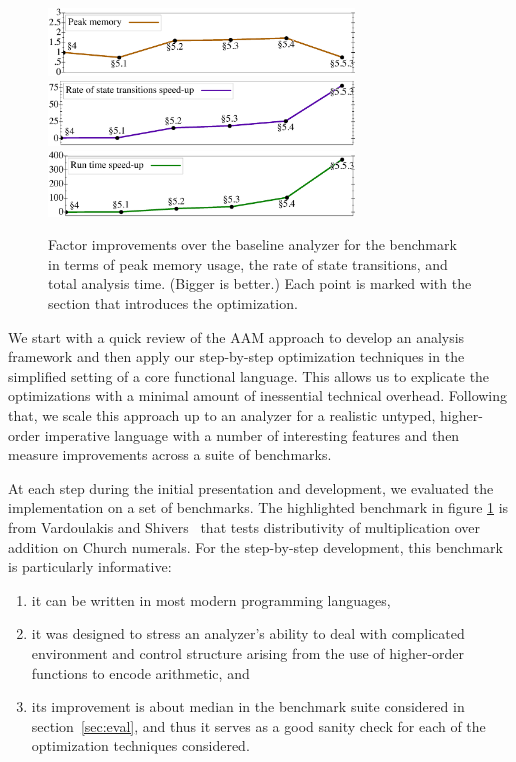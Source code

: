 \documentclass[preprint,onecolumn,9pt]{sigplanconf} %
\begin{document}
\begin{figure}[t]
\begin{center}
\includegraphics[width=3.2in]{church-relative-space}
\includegraphics[width=3.2in]{church-relative-speed}
\includegraphics[width=3.2in]{church-relative-time}
\vspace{-1.5em}
\end{center}
\caption{Factor improvements over the baseline analyzer for the
  \Church{} benchmark in terms of peak memory usage, the rate of state
  transitions, and total analysis time. (Bigger is better.) Each point
  is marked with the section that introduces the optimization.}
\label{fig:churchtime}
\end{figure}


We start with a quick review of the AAM approach to develop an
analysis framework and then apply our step-by-step optimization
techniques in the simplified setting of a core functional language.
This allows us to explicate the optimizations with a minimal amount of
inessential technical overhead.  Following that, we scale this
approach up to an analyzer for a realistic untyped, higher-order
imperative language with a number of interesting features and then
measure improvements across a suite of benchmarks.

At each step during the initial presentation and development, we
evaluated the implementation on a set of benchmarks. The highlighted
benchmark in figure \ref{fig:churchtime} is from Vardoulakis and
Shivers~\cite{dvanhorn:Vardoulakis2011CFA2} that tests distributivity
of multiplication over addition on Church numerals.  For the
step-by-step development, this benchmark is particularly informative:
\begin{enumerate}
\item it can be written in most modern programming languages,
%
\item it was designed to stress an analyzer's ability to deal with
  complicated environment and control structure arising from the use
  of higher-order functions to encode arithmetic, and
%
\item its improvement is about median in the benchmark suite
  considered in section~\ref{sec:eval}, and thus it serves as a good
  sanity check for each of the optimization techniques considered.
\end{enumerate}
\end{document}
